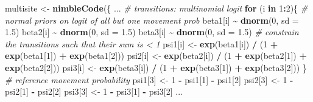 \documentclass[
  12pt,
]{krantz}
\newenvironment{Shaded}{\begin{snugshade}}{\end{snugshade}}
\newcommand{\AttributeTok}[1]{\textcolor[rgb]{0.13,0.29,0.53}{#1}}
\newcommand{\CommentTok}[1]{\textcolor[rgb]{0.56,0.35,0.01}{\textit{#1}}}
\newcommand{\ControlFlowTok}[1]{\textcolor[rgb]{0.13,0.29,0.53}{\textbf{#1}}}
\newcommand{\DecValTok}[1]{\textcolor[rgb]{0.00,0.00,0.81}{#1}}
\newcommand{\FloatTok}[1]{\textcolor[rgb]{0.00,0.00,0.81}{#1}}
\newcommand{\FunctionTok}[1]{\textcolor[rgb]{0.13,0.29,0.53}{\textbf{#1}}}
\newcommand{\NormalTok}[1]{#1}
\newcommand{\OtherTok}[1]{\textcolor[rgb]{0.56,0.35,0.01}{#1}}
\newcommand{\SpecialCharTok}[1]{\textcolor[rgb]{0.81,0.36,0.00}{\textbf{#1}}}
\begin{document}
\begin{Shaded}
\begin{Highlighting}[]
\NormalTok{multisite }\OtherTok{\textless{}{-}} \FunctionTok{nimbleCode}\NormalTok{(\{}
\NormalTok{...}
  \CommentTok{\# transitions: multinomial logit}
  \ControlFlowTok{for}\NormalTok{ (i }\ControlFlowTok{in} \DecValTok{1}\SpecialCharTok{:}\DecValTok{2}\NormalTok{)\{}
    \CommentTok{\# normal priors on logit of all but one movement prob}
\NormalTok{    beta1[i] }\SpecialCharTok{\textasciitilde{}} \FunctionTok{dnorm}\NormalTok{(}\DecValTok{0}\NormalTok{, }\AttributeTok{sd =} \FloatTok{1.5}\NormalTok{)}
\NormalTok{    beta2[i] }\SpecialCharTok{\textasciitilde{}} \FunctionTok{dnorm}\NormalTok{(}\DecValTok{0}\NormalTok{, }\AttributeTok{sd =} \FloatTok{1.5}\NormalTok{)}
\NormalTok{    beta3[i] }\SpecialCharTok{\textasciitilde{}} \FunctionTok{dnorm}\NormalTok{(}\DecValTok{0}\NormalTok{, }\AttributeTok{sd =} \FloatTok{1.5}\NormalTok{)}
    \CommentTok{\# constrain the transitions such that their sum is \textless{} 1}
\NormalTok{    psi1[i] }\OtherTok{\textless{}{-}} \FunctionTok{exp}\NormalTok{(beta1[i]) }\SpecialCharTok{/}\NormalTok{ (}\DecValTok{1} \SpecialCharTok{+} \FunctionTok{exp}\NormalTok{(beta1[}\DecValTok{1}\NormalTok{]) }\SpecialCharTok{+} \FunctionTok{exp}\NormalTok{(beta1[}\DecValTok{2}\NormalTok{]))}
\NormalTok{    psi2[i] }\OtherTok{\textless{}{-}} \FunctionTok{exp}\NormalTok{(beta2[i]) }\SpecialCharTok{/}\NormalTok{ (}\DecValTok{1} \SpecialCharTok{+} \FunctionTok{exp}\NormalTok{(beta2[}\DecValTok{1}\NormalTok{]) }\SpecialCharTok{+} \FunctionTok{exp}\NormalTok{(beta2[}\DecValTok{2}\NormalTok{]))}
\NormalTok{    psi3[i] }\OtherTok{\textless{}{-}} \FunctionTok{exp}\NormalTok{(beta3[i]) }\SpecialCharTok{/}\NormalTok{ (}\DecValTok{1} \SpecialCharTok{+} \FunctionTok{exp}\NormalTok{(beta3[}\DecValTok{1}\NormalTok{]) }\SpecialCharTok{+} \FunctionTok{exp}\NormalTok{(beta3[}\DecValTok{2}\NormalTok{]))}
\NormalTok{  \}}
  \CommentTok{\# reference movement probability}
\NormalTok{  psi1[}\DecValTok{3}\NormalTok{] }\OtherTok{\textless{}{-}} \DecValTok{1} \SpecialCharTok{{-}}\NormalTok{ psi1[}\DecValTok{1}\NormalTok{] }\SpecialCharTok{{-}}\NormalTok{ psi1[}\DecValTok{2}\NormalTok{]}
\NormalTok{  psi2[}\DecValTok{3}\NormalTok{] }\OtherTok{\textless{}{-}} \DecValTok{1} \SpecialCharTok{{-}}\NormalTok{ psi2[}\DecValTok{1}\NormalTok{] }\SpecialCharTok{{-}}\NormalTok{ psi2[}\DecValTok{2}\NormalTok{]}
\NormalTok{  psi3[}\DecValTok{3}\NormalTok{] }\OtherTok{\textless{}{-}} \DecValTok{1} \SpecialCharTok{{-}}\NormalTok{ psi3[}\DecValTok{1}\NormalTok{] }\SpecialCharTok{{-}}\NormalTok{ psi3[}\DecValTok{2}\NormalTok{]}
\NormalTok{...}
\end{Highlighting}
\end{Shaded}
\end{document}
